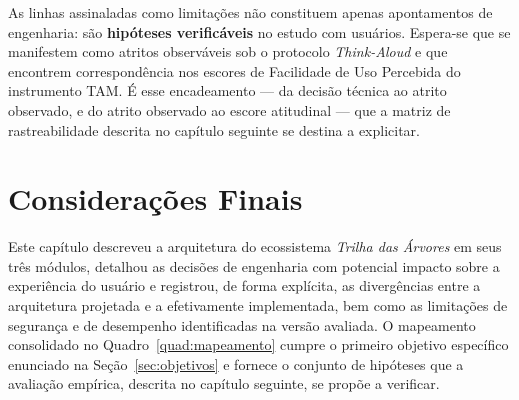 As linhas assinaladas como limitações não constituem apenas apontamentos de
engenharia: são \textbf{hipóteses verificáveis} no estudo com usuários. Espera-se
que se manifestem como atritos observáveis sob o protocolo \textit{Think-Aloud} e
que encontrem correspondência nos escores de Facilidade de Uso Percebida do
instrumento TAM. É esse encadeamento --- da decisão técnica ao atrito observado, e
do atrito observado ao escore atitudinal --- que a matriz de rastreabilidade
descrita no capítulo seguinte se destina a explicitar.

\section{Considerações Finais}
\label{sec:dev_finais}

Este capítulo descreveu a arquitetura do ecossistema \textit{Trilha das Árvores}
em seus três módulos, detalhou as decisões de engenharia com potencial impacto
sobre a experiência do usuário e registrou, de forma explícita, as divergências
entre a arquitetura projetada e a efetivamente implementada, bem como as
limitações de segurança e de desempenho identificadas na versão avaliada. O
mapeamento consolidado no Quadro~\ref{quad:mapeamento} cumpre o primeiro objetivo
específico enunciado na Seção~\ref{sec:objetivos} e fornece o conjunto de
hipóteses que a avaliação empírica, descrita no capítulo seguinte, se propõe a
verificar.
